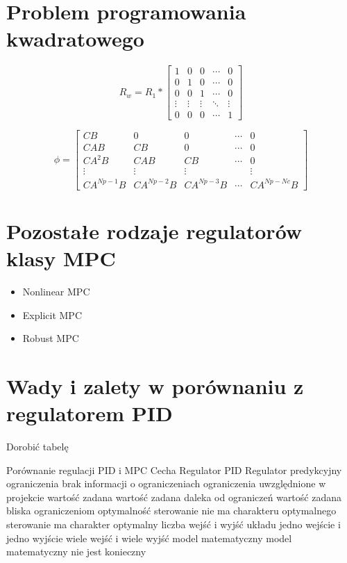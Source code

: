 \section{Problem programowania kwadratowego} \label{sec:qp}
\begin{equation}
	R_{w} = R_{1} * \begin{bmatrix}
	1 & 0 & 0 & \cdots & 0 \\[-0.8ex]
	0 & 1 & 0 & \cdots & 0 \\[-0.8ex]
	0 & 0 & 1 & \cdots & 0 \\[-0.8ex]
    \vdots & \vdots & \vdots & \ddots & \vdots \\[-0.8ex]
    0 & 0 & 0 & \cdots & 1
	\end{bmatrix}
\label{eq:Rw}
\end{equation}

\begin{equation}
	\phi = \begin{bmatrix}
	CB & 0 & 0 & \cdots & 0 \\
	CAB & CB & 0 & \cdots & 0 \\
	CA^{2}B & CAB & CB & \cdots & 0 \\
    \vdots & \vdots & \vdots &  & \vdots \\
    CA^{Np-1}B & CA^{Np-2}B & CA^{Np-3}B & \cdots & CA^{Np-Nc}B
	\end{bmatrix}
\label{eq:phi}
\end{equation}

\section{Pozostałe rodzaje regulatorów klasy MPC} \label{sec:other}

\begin{itemize}
	\item Nonlinear MPC
	\item Explicit MPC
    \item Robust MPC
\end{itemize}

\section{Wady i zalety w porównaniu z regulatorem PID} \label{sec:comparison}
Dorobić tabelę

Porównanie regulacji PID i MPC
Cecha	Regulator PID	Regulator predykcyjny
ograniczenia	brak informacji o ograniczeniach	ograniczenia uwzględnione w projekcie
wartość zadana	wartość zadana daleka od ograniczeń	wartość zadana bliska ograniczeniom
optymalność	sterowanie nie ma charakteru optymalnego	sterowanie ma charakter optymalny
liczba wejść i wyjść układu	jedno wejście i jedno wyjście	wiele wejść i wiele wyjść
model matematyczny	model matematyczny nie jest konieczny